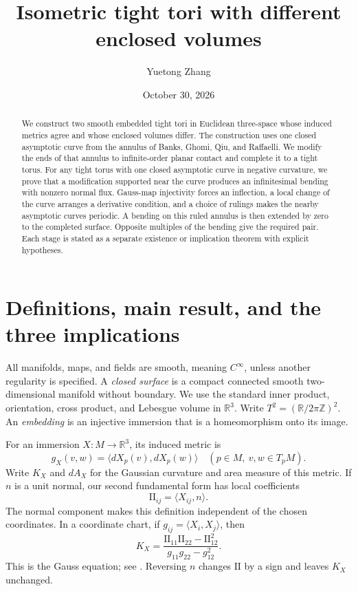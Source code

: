\documentclass[11pt]{amsart}
\title{Isometric tight tori with different enclosed volumes}
\author{Yuetong Zhang}
\date{October 30, 2026}
\theoremstyle{definition}
\newcommand{\R}{\mathbb R}
\begin{document}
\begin{abstract}
We construct two smooth embedded tight tori in Euclidean three-space
whose induced metrics agree and whose enclosed volumes differ. The
construction uses one closed asymptotic curve from the annulus of
Banks, Ghomi, Qiu, and Raffaelli. We modify the ends of that annulus
to infinite-order planar contact and complete it to a tight torus.
For any tight torus with one closed asymptotic curve in negative
curvature, we prove that a modification supported near the curve
produces an infinitesimal bending with nonzero normal flux.
Gauss-map injectivity forces an inflection, a local change of the curve
arranges a derivative condition, and a choice of rulings makes the
nearby asymptotic curves periodic. A bending on this ruled annulus is
then extended by zero to the completed surface. Opposite multiples of
the bending give the required pair. Each stage is stated as a separate
existence or implication theorem with explicit hypotheses.
\end{abstract}
\maketitle

\section{Definitions, main result, and the three implications}

All manifolds, maps, and fields are smooth, meaning $C^\infty$, unless
another regularity is specified. A \emph{closed surface} is a compact
connected smooth two-dimensional manifold without boundary. We use
the standard inner product, orientation, cross product, and Lebesgue
volume in $\R^3$. Write $T^2=(\R/2\pi\mathbb Z)^2$.
An \emph{embedding} is an injective immersion that is a homeomorphism
onto its image.

For an immersion $X:M\to\R^3$, its induced metric is
\[
 g_X(v,w)=\langle dX_p(v),dX_p(w)\rangle
 \quad (p\in M,\ v,w\in T_pM).
\]
Write $K_X$ and $dA_X$ for the Gaussian curvature and area measure of
this metric. If $n$ is a unit normal, our second fundamental form has
local coefficients
\[
 \mathrm{II}_{ij}=\langle X_{ij},n\rangle.
\]
The normal component makes this definition independent of the chosen
coordinates. In a coordinate chart, if $g_{ij}=\langle X_i,X_j\rangle$,
then
\begin{equation}\label{eq:gauss-curvature}
 K_X=\frac{\mathrm{II}_{11}\mathrm{II}_{22}
                 -\mathrm{II}_{12}^2}{g_{11}g_{22}-g_{12}^2}.
\end{equation}
This is the Gauss equation; see \cite[\S3-3 and \S4-3]{doCarmo}.
Reversing $n$ changes $\mathrm{II}$ by a sign and leaves $K_X$ unchanged.
\end{document}
